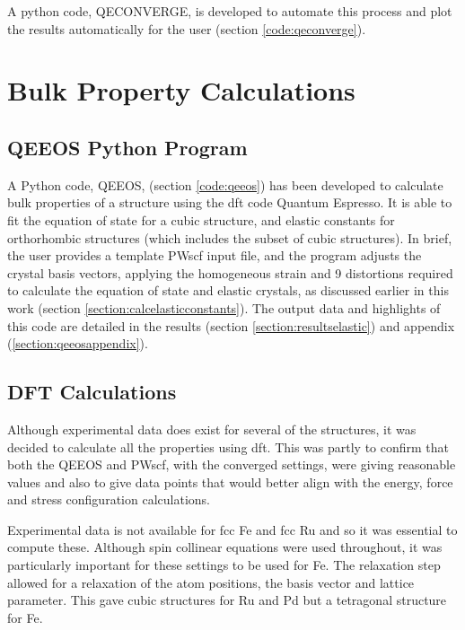 A python code, QECONVERGE, is developed to automate this process and plot the results automatically for the user (section \ref{code:qeconverge}).



\section{Bulk Property Calculations}

\subsection{QEEOS Python Program}
\label{section:qeeospyprog}

A Python code, QEEOS, (section \ref{code:qeeos}) has been developed to calculate bulk properties of a structure using the \acrshort{dft} code Quantum Espresso.  It is able to fit the equation of state for a cubic structure, and elastic constants for orthorhombic structures (which includes the subset of cubic structures).  In brief, the user provides a template PWscf input file, and the program adjusts the crystal basis vectors, applying the homogeneous strain and 9 distortions required to calculate the equation of state and elastic crystals, as discussed earlier in this work (section \ref{section:calcelasticconstants}).  The output data and highlights of this code are detailed in the results (section \ref{section:resultselastic}) and appendix (\ref{section:qeeosappendix}).


\subsection{DFT Calculations}

Although experimental data does exist for several of the structures, it was decided to calculate all the properties using \acrshort{dft}.  This was partly to confirm that both the QEEOS and PWscf, with the converged settings, were giving reasonable values and also to give data points that would better align with the energy, force and stress configuration calculations.

Experimental data is not available for \acrshort{fcc} Fe and \acrshort{fcc} Ru and so it was essential to compute these.  Although spin collinear equations were used throughout, it was particularly important for these settings to be used for Fe.  The relaxation step allowed for a relaxation of the atom positions, the basis vector and lattice parameter.  This gave cubic structures for Ru and Pd but a tetragonal structure for Fe.

